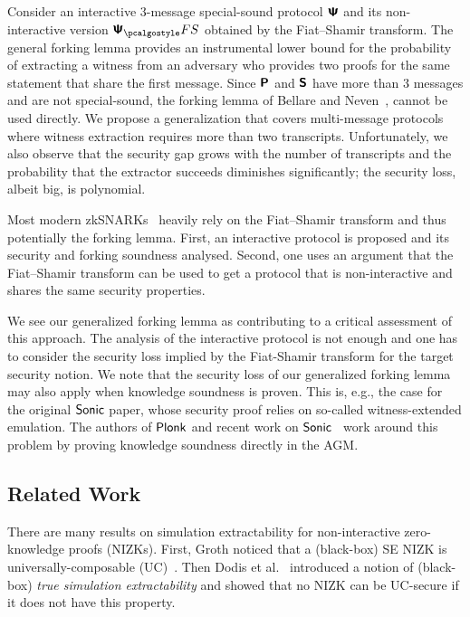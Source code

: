   Consider an interactive $3$-message
special-sound protocol $\bm{\mathsf{\Psi}}$ and its non-interactive version $\ps_\fs$ obtained by the
Fiat--Shamir transform. The general forking lemma provides an instrumental lower bound for the
probability of extracting a witness from an adversary who provides two proofs for the same
statement that share the first message. Since $\bm{\mathsf{P}}$ and $\bm{\mathsf{S}}$ have more than $3$
messages and are not special-sound, the forking lemma of Bellare and Neven~\cite{CCS:BelNev06},
cannot be used directly. We propose a generalization that covers multi-message protocols where
witness extraction requires more than two transcripts.  Unfortunately, we also observe
that the security gap grows with the number of transcripts and the probability that the
extractor succeeds diminishes significantly; the security loss, albeit big, is polynomial.

Most modern zkSNARKs~\cite{SP:BBBPWM18,CCS:MBKM19} heavily
rely on the Fiat--Shamir transform and thus potentially the forking lemma. First, an interactive
protocol is proposed and its security and forking soundness analysed. Second,
one uses an argument that the Fiat--Shamir transform can be used to get a
protocol that is non-interactive and shares the same security properties.

We see our generalized forking lemma as contributing to a critical assessment of
this approach. The analysis of the interactive protocol is not enough and one
has to consider the security loss implied by the Fiat-Shamir transform for the target security notion.
We note that the security loss of our generalized forking lemma may also apply
when knowledge soundness is proven. This is, e.g., the case for the original
${\textnormal{\textsf{Sonic}}}$ paper, whose security proof relies on so-called witness-extended
emulation. The authors of $\textnormal{\textsf{Plonk}}$ and recent work on
${\textnormal{\textsf{Sonic}}}$~\cite{cryptoeprint:2020:1351} work around this problem by proving
knowledge soundness directly in the AGM.



\subsection{Related Work}
 

There are many results on simulation extractability for
non-interactive zero-knowledge proofs (NIZKs). First, Groth \cite{AC:Groth07}
noticed that a (black-box) SE NIZK is
universally-composable (UC)~\cite{EPRINT:Canetti00}. Then Dodis et al.~\cite{AC:DHLW10} introduced a
notion of (black-box) \emph{true simulation extractability} and showed that no
NIZK can be UC-secure if it does not have this property. 

